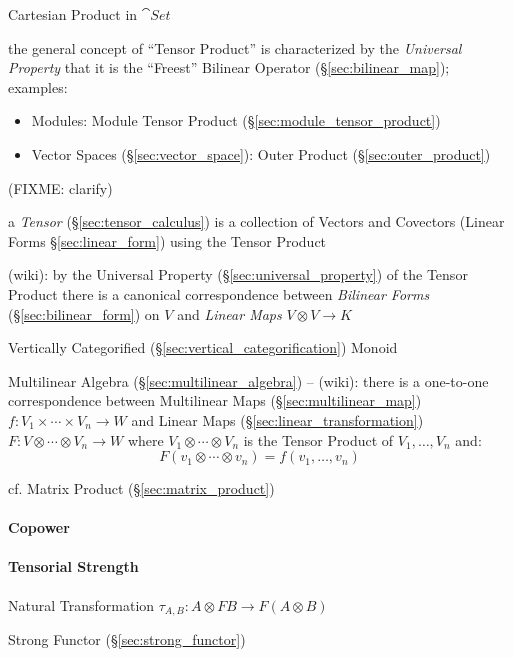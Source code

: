 Cartesian Product in $\cat{Set}$

the general concept of ``Tensor Product'' is characterized by the
\emph{Universal Property} that it is the ``Freest'' Bilinear Operator
(\S\ref{sec:bilinear_map}); examples:
\begin{itemize}
\item Modules: Module Tensor Product (\S\ref{sec:module_tensor_product})
\item Vector Spaces (\S\ref{sec:vector_space}): Outer Product
  (\S\ref{sec:outer_product})
\end{itemize}
(FIXME: clarify)

\fist a \emph{Tensor} (\S\ref{sec:tensor_calculus}) is a collection of Vectors
and Covectors (Linear Forms \S\ref{sec:linear_form}) using the Tensor Product

(wiki): by the Universal Property (\S\ref{sec:universal_property}) of the Tensor
Product there is a canonical correspondence between \emph{Bilinear Forms}
(\S\ref{sec:bilinear_form}) on $V$ and \emph{Linear Maps} $V \otimes V \to K$

Vertically Categorified (\S\ref{sec:vertical_categorification}) Monoid

Multilinear Algebra (\S\ref{sec:multilinear_algebra}) --
(wiki): there is a one-to-one correspondence between Multilinear Maps
(\S\ref{sec:multilinear_map})
$f : V_1 \times \cdots \times V_n \rightarrow W$
and Linear Maps (\S\ref{sec:linear_transformation})
$F : V \otimes \cdots \otimes V_n \rightarrow W$
where $V_1 \otimes \cdots \otimes V_n$ is the Tensor Product of
$V_1, \ldots, V_n$ and:
\[
  F(v_1 \otimes \cdots \otimes v_n) = f(v_1, \ldots, v_n)
\]

cf. Matrix Product (\S\ref{sec:matrix_product})



\paragraph{Copower}\label{sec:copower}\hfill

\paragraph{Tensorial Strength}\label{sec:tensorial_strength}\hfill

Natural Transformation $\tau_{A,B} : A \otimes F B \rightarrow F (A
\otimes B)$

Strong Functor (\S\ref{sec:strong_functor})

